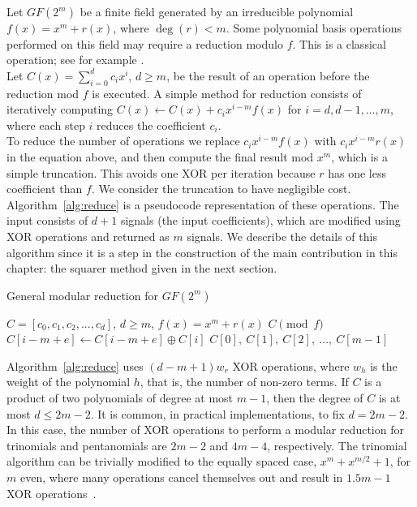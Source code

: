 Let $GF(2^m)$ be a finite field generated by an irreducible polynomial $f(x) = x^m + r(x)$, where $\deg(r) < m$. Some polynomial basis operations performed on this field may require a reduction modulo $f$. This is a classical operation; see for example \cite[Chapter~2.3.5]{hankerson2006guide}.\\

Let $C(x) = \sum_{i=0}^{d} c_i x^i$, $d \geq m$, be the result of an operation before the reduction mod $f$ is executed. A simple method for reduction consists of iteratively computing $C(x) \leftarrow C(x) + c_{i} x^{i-m} f(x)$ for $i = d, d-1, \ldots, m$, where each step $i$ reduces the coefficient $c_{i}$.\\

To reduce the number of operations we replace $c_{i} x^{i-m} f(x)$ with $c_{i} x^{i-m} r(x)$ in the equation above, and then compute the final result mod $x^m$, which is a simple truncation. This avoids one XOR per iteration because $r$ has one less coefficient than $f$. We consider the truncation to have negligible cost. Algorithm~\ref{alg:reduce} is a pseudocode representation of these operations. The input consists of $d+1$ signals (the input coefficients), which are modified using XOR operations and returned as $m$ signals. We describe the details of this algorithm since it is a step in the construction of the main contribution in this chapter: the squarer method given in the next section. \\

\begin{algorithm}
\caption{General modular reduction for $GF(2^m)$}
\label{alg:reduce}
\begin{algorithmic}[1]
\REQUIRE $C = [c_0, c_1, c_2, ..., c_d]$, $d \geq m$, $f(x) = x^m + r(x)$
\ENSURE $C \pmod f$
\STATE $C[i-m+e] \leftarrow C[i-m+e] \oplus C[i]$ \label{alg:reduce:op}
\ENDFOR
\ENDFOR
\RETURN $C[0],~C[1],~C[2],~\ldots,~C[m-1]$
\end{algorithmic}
\end{algorithm}

Algorithm~\ref{alg:reduce} uses $(d-m+1)w_r$ XOR operations, where $w_h$ is the weight of the polynomial $h$, that is, the number of non-zero terms. If $C$ is a product of two polynomials of degree at most $m-1$, then the degree of $C$ is at most $d \leq 2m-2$. It is common, in practical implementations, to fix $d=2m-2$. In this case, the number of XOR operations to perform a modular reduction for trinomials and pentanomials are $2m-2$ and $4m-4$, respectively. The trinomial algorithm can be trivially modified to the equally spaced case, $x^m+x^{m/2}+1$, for $m$ even, where many operations cancel themselves out and result in $1.5 m - 1$ XOR operations~\cite{wu2002bit}.\\

